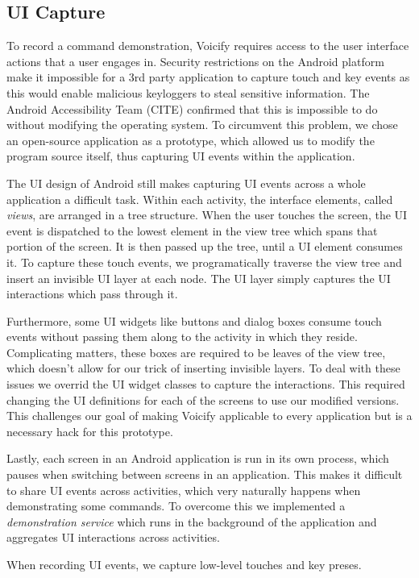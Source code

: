\documentclass[letterpaper]{article}
\begin{document}
\subsection{UI Capture}
To record a command demonstration, Voicify requires access to the user interface actions that a user engages in.
Security restrictions on the Android platform make it impossible for a 3rd party application to capture 
touch and key events as this would enable malicious keyloggers to steal sensitive information. 
The Android Accessibility Team (CITE) confirmed that this is impossible to do without modifying the operating system.
To circumvent this problem, we chose an open-source application as a prototype, which allowed us to modify
the program source itself, thus capturing UI events within the application.

The UI design of Android still makes capturing UI events across a whole application a difficult task.
Within each activity, the interface elements, called \emph{views}, are arranged in a tree structure. When the user
touches the screen, the UI event is dispatched to the lowest element in the view tree which spans that portion of the 
screen. It is then passed up the tree, until a UI element consumes it. To capture these touch events,
we programatically traverse the view tree and insert an invisible UI layer at each node. The UI layer
simply captures the UI interactions which pass through it.

Furthermore, some UI widgets like buttons and dialog boxes consume touch events without passing them along
to the activity in which they reside. Complicating matters, these boxes are required to be leaves
of the view tree, which doesn't allow for our trick of inserting invisible layers. To deal with these issues
we overrid the UI widget classes to capture the interactions. This required changing the UI definitions for
each of the screens to use our modified versions. This challenges our goal of making Voicify applicable to
every application but is a necessary hack for this prototype.

Lastly, each screen in an Android application is run in its own process, which pauses when switching between
screens in an application. This makes it difficult to share UI events across activities, which very naturally
happens when demonstrating some commands. To overcome this we implemented a \emph{demonstration service} which runs in the background
of the application and aggregates UI interactions across activities.

When recording UI events, we capture low-level touches and key preses.
\end{document}
